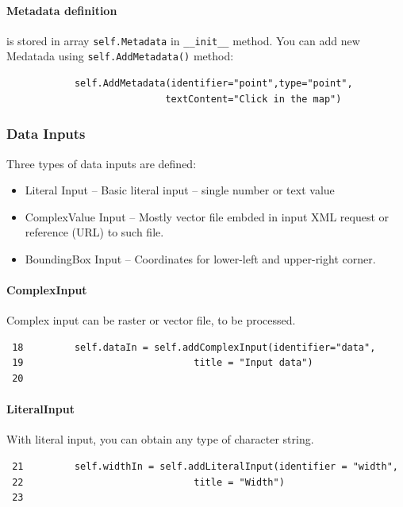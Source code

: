 \documentclass[a4paper,11pt]{article}
\begin{document}
\paragraph{Metadata definition} is stored in array \texttt{self.Metadata} in
\texttt{\_\_init\_\_} method. You can add new Medatada using
\texttt{self.AddMetadata()} method:
\begin{verbatim}
            self.AddMetadata(identifier="point",type="point",
                            textContent="Click in the map")
\end{verbatim}

\subsubsection{Data Inputs}

Three types of data inputs are defined:
\begin{itemize}
    \item Literal Input -- Basic literal input -- single number or text
    value
    \item ComplexValue Input  -- Mostly vector file embded in input XML
    request or reference (URL) to such file.
    \item BoundingBox Input -- Coordinates for lower-left and upper-right
    corner.
\end{itemize}


\paragraph{ComplexInput}
Complex input can be raster or vector file, to be processed. 

\begin{verbatim}
 18         self.dataIn = self.addComplexInput(identifier="data",
 19                              title = "Input data")
 20 
\end{verbatim}

\paragraph{LiteralInput}

With literal input, you can obtain any type of character string.

\begin{verbatim}
 21         self.widthIn = self.addLiteralInput(identifier = "width",
 22                              title = "Width")
 23 
\end{verbatim}
\end{document}
